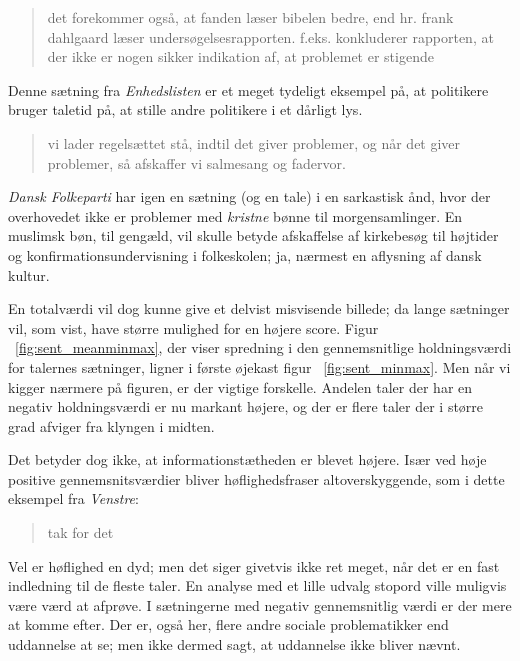 \begin{quotation}
det forekommer også, at fanden læser bibelen bedre, end hr. frank dahlgaard læser undersøgelsesrapporten. f.eks. konkluderer rapporten, at der ikke er nogen sikker indikation af, at problemet er stigende 
\end{quotation}

Denne sætning fra \textit{Enhedslisten} er et meget tydeligt eksempel på, at politikere bruger taletid på, at stille andre politikere i et dårligt lys.

\begin{quotation}
vi lader regelsættet stå, indtil det giver problemer, og når det giver problemer, så afskaffer vi salmesang og fadervor.
\end{quotation}

\textit{Dansk Folkeparti} har igen en sætning (og en tale) i en sarkastisk ånd, hvor der overhovedet ikke er problemer med \textit{kristne} bønne til morgensamlinger.
En muslimsk bøn, til gengæld, vil skulle betyde afskaffelse af kirkebesøg til højtider og konfirmationsundervisning i folkeskolen; ja, nærmest en aflysning af dansk kultur.

En totalværdi vil dog kunne give et delvist misvisende billede; da lange sætninger vil, som vist, have større mulighed for en højere score.
Figur ~\ref{fig:sent_meanminmax}, der viser spredning i den gennemsnitlige holdningsværdi for talernes sætninger, ligner i første øjekast figur ~\ref{fig:sent_minmax}.
Men når vi kigger nærmere på figuren, er der vigtige forskelle.
Andelen taler der har en negativ holdningsværdi er nu markant højere, og der er flere taler der i større grad afviger fra klyngen i midten.

Det betyder dog ikke, at informationstætheden er blevet højere.
Især ved høje positive gennemsnitsværdier bliver høflighedsfraser altoverskyggende, som i dette eksempel fra \textit{Venstre}:

\begin{quotation}
tak for det
\end{quotation}

Vel er høflighed en dyd; men det siger givetvis ikke ret meget, når det er en fast indledning til de fleste taler.
En analyse med et lille udvalg stopord ville muligvis være værd at afprøve.
I sætningerne med negativ gennemsnitlig værdi er der mere at komme efter.
Der er, også her, flere andre sociale problematikker end uddannelse at se; men ikke dermed sagt, at uddannelse ikke bliver nævnt.

